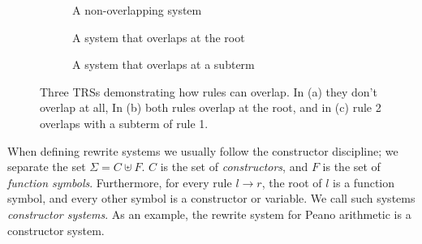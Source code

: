\documentclass{book}
\theoremstyle{definition}
\begin{document}
\begin{figure}[h]
    \begin{subfigure}{.26\textwidth}
    \caption{A non-overlapping system}
    \end{subfigure}
    \hspace{.06\textwidth}
    \begin{subfigure}{.26\textwidth}
    \caption{A system that overlaps at the root}
    \end{subfigure}
    \hspace{.06\textwidth}
    \begin{subfigure}{.26\textwidth}
    \caption{A system that overlaps at a subterm}
    \end{subfigure}
    \caption{Three TRSs demonstrating how rules can overlap.
            In (a) they don't overlap at all,
            In (b) both rules overlap at the root,
            and in (c) rule 2 overlaps with a subterm of rule 1.}
    \label{fig:overlap}
\end{figure}

When defining rewrite systems we usually follow the constructor discipline;
we separate the set $\Sigma = C \uplus F$.
$C$ is the set of \textit{constructors},
and $F$ is the set of \textit{function symbols}.
Furthermore, for every rule $l \to r$, the root of $l$ is a function symbol, 
and every other symbol is a constructor or variable.
We call such systems \textit{constructor systems}.
As an example, the rewrite system for Peano arithmetic is a constructor system.
\end{document}
